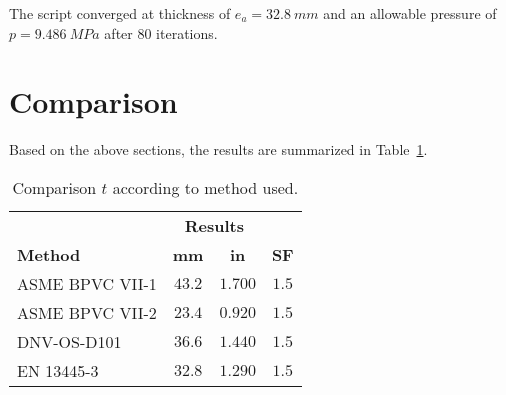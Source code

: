 The script converged at thickness of $e_a = 32.8\ mm$ and an allowable pressure of $p = 9.486\ MPa$ after 80 iterations. 
\section{Comparison}

Based on the above sections, the results are summarized in Table~\ref{table:2_comp}.
\begin{table}[htbp]
  \centering
  \caption{Comparison $t$ according to method used.}
    \begin{tabular}{lccc}
          & \multicolumn{2}{c}{\textbf{Results}} &  \\
    \textbf{Method} & \textbf{mm} & \textbf{in} & \textbf{SF} \\
    ASME BPVC VII-1 & $43.2$  & $1.700$ & $1.5$ \\
    ASME BPVC VII-2 & $23.4$  & $0.920$ & $1.5$ \\
    DNV-OS-D101 & $36.6$  & $1.440$ & $1.5$ \\
    EN 13445-3 & $32.8$  & $1.290$ & $1.5$ \\
    \end{tabular}%
  \label{table:2_comp}%
\end{table}%

